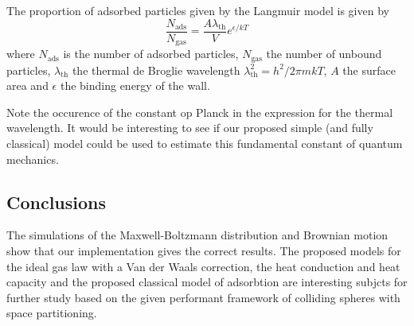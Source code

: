 The proportion of adsorbed particles given by the Langmuir model is given 
by\cite{adsorbtionModel}
$$
\frac{N_\mathrm{ads}}{N_\mathrm{gas}} =
\frac{A \lambda_\mathrm{th}}{V}e^{\epsilon/kT}
$$
where $N_\mathrm{ads}$ is the number of adsorbed particles, $N_\mathrm{gas} 
$ the number of unbound particles, $\lambda_{\textrm{th}}$ the thermal de 
Broglie wavelength $\lambda_{\mathrm{th}}^2 = h^2 / 2 \pi m k T$, $A$ the 
surface area and $\epsilon$ the binding energy of the wall.

Note the occurence of the constant op Planck in the expression for the 
thermal wavelength. It would be interesting to see if our proposed simple 
(and fully classical) model could be used to estimate this fundamental 
constant of quantum mechanics.


\subsection{Conclusions}
The simulations of the Maxwell-Boltzmann distribution and Brownian motion 
show that our implementation gives the correct results. The proposed models
for the ideal gas law with a Van der Waals correction, the heat conduction 
and heat capacity and the proposed classical model of adsorbtion are 
interesting subjcts for further study based on the given performant 
framework of colliding spheres with space partitioning.
